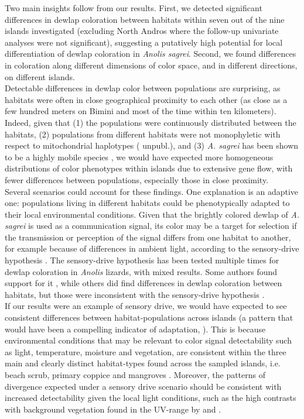 Two main insights follow from our results. First, we detected significant differences in dewlap coloration between habitats within seven out of the nine islands investigated (excluding North Andros where the follow-up univariate analyses were not significant), suggesting a putatively high potential for local differentiation of dewlap coloration in \textit{Anolis sagrei}. Second, we found differences in coloration along different dimensions of color space, and in different directions, on different islands.\\

Detectable differences in dewlap color between populations are surprising, as habitats were often in close geographical proximity to each other (as close as a few hundred meters on Bimini and most of the time within ten kilometers). Indeed, given that (1) the populations were continuously distributed between the habitats, (2) populations from different habitats were not monophyletic with respect to mitochondrial haplotypes (\citealt{vandeSchoot2016} unpubl.), and (3) \textit{A. sagrei} has been shown to be a highly mobile species \citep{Kamath2018}, we would have expected more homogeneous distributions of color phenotypes within islands due to extensive gene flow, with fewer differences between populations, especially those in close proximity.\\

Several scenarios could account for these findings. One explanation is an adaptive one: populations living in different habitats could be phenotypically adapted to their local environmental conditions. Given that the brightly colored dewlap of \textit{A. sagrei} is used as a communication signal, its color may be a target for selection if the transmission or perception of the signal differs from one habitat to another, for example because of differences in ambient light, according to the sensory-drive hypothesis \citep{Endler1988, Endler1992, Endler1998}. The sensory-drive hypothesis has been tested multiple times for dewlap coloration in \textit{Anolis} lizards, with mixed results. Some authors found support for it \citep{Leal2002, Leal2004}, while others did find differences in dewlap coloration between habitats, but those were inconsistent with the sensory-drive hypothesis \citep{Fleishman2009, Ng2012}.\\

If our results were an example of sensory drive, we would have expected to see consistent differences between habitat-populations across islands (a pattern that would have been a compelling indicator of adaptation, \citealt{Losos2011}). This is because environmental conditions that may be relevant to color signal detectability such as light, temperature, moisture and vegetation, are consistent within the three main and clearly distinct habitat-types found across the sampled islands, i.e. beach scrub, primary coppice and mangroves \citep{Howard1950, Schoener1968}. Moreover, the patterns of divergence expected under a sensory drive scenario should be consistent with increased detectability given the local light conditions, such as the high contrasts with background vegetation found in the UV-range by \citet{Leal2002} and \citet{Leal2004}.\\

